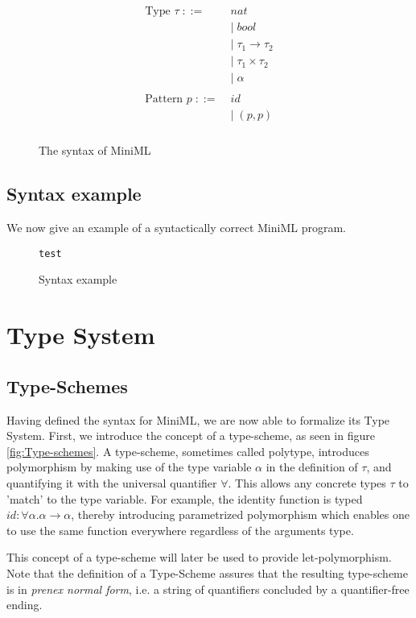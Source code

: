 \documentclass[10pt,a4paper,draft]{article}
\begin{document}
\begin{flushleft}
\begin{figure}[!htbp]
\begin{align*}
\begin{aligned}
\\
\text{Type }\tau \; ::= \; &nat \\
&| \; \mathit{bool} \\
&| \; \tau_{1} \rightarrow \tau_{2} \\
&| \; \tau_{1} \times \tau_{2} \\
&| \; \alpha\\
\\
\text{Pattern }p \; ::= \; & \mathit{id} \\
&| \; (p,p)\\
\end{aligned}
\end{align*}
\caption{The syntax of MiniML}
\end{figure}

\subsection{Syntax example}
We now give an example of a syntactically correct MiniML program.

\begin{figure}[!htbp]
\begin{verbatim}
test
\end{verbatim}
\caption{Syntax example}
\label{code:SyntaxExample}
\end{figure}

\section{Type System}

\subsection{Type-Schemes}
Having defined the syntax for MiniML, we are now able to formalize its Type System. First, we introduce the concept of a type-scheme, as seen in figure \ref{fig:Type-schemes}. A type-scheme, sometimes called polytype, introduces polymorphism by making use of the type variable $\alpha$ in the definition of $\tau$, and quantifying it with the universal quantifier $\forall$. This allows any concrete types $\tau$ to 'match' to the type variable. For example, the identity function  is typed $id:\forall \alpha. \alpha \rightarrow \alpha$, thereby introducing parametrized polymorphism which enables one to use the same  function everywhere regardless of the arguments type.

This concept of a type-scheme will later be used to provide let-polymorphism.  Note that the definition of a Type-Scheme assures that the resulting type-scheme is in \emph{prenex normal form}, i.e. a string of quantifiers concluded by a quantifier-free ending.


\end{flushleft}
\end{document}
